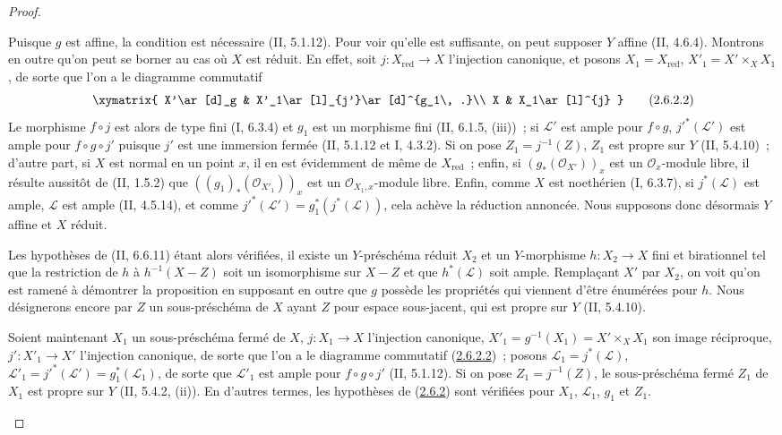 \begin{proof}
\begin{env}[2.6.2.1]
\label{III.2.6.2.1-fr}
Puisque $g$ est affine, la condition est nécessaire (II, 5.1.12). Pour
voir qu'elle est suffisante, on peut supposer $Y$ affine (II, 4.6.4).
Montrons en outre qu'on peut se borner au cas où $X$ est réduit. En
effet, soit $j:X_{\mathrm{red}}\to X$ l'injection canonique, et posons
$X_1=X_{\mathrm{red}}$, $X'_1=X'\times_X X_1$, de sorte que l'on a le
diagramme commutatif
\[
\xymatrix{
X'\ar[d]_g & X'_1\ar[l]_{j'}\ar[d]^{g_1\, .}\\
X & X_1\ar[l]^{j}
}
\tag{2.6.2.2}\label{III.2.6.2.2-fr}
\]
Le morphisme $f\circ j$ est alors de type fini (I, 6.3.4) et $g_1$ est
un morphisme fini (II, 6.1.5, (iii))~; si $\mathcal L'$ est ample pour
$f\circ g$, $j'^*(\mathcal L')$ est ample pour $f\circ g\circ j'$ puisque
$j'$ est une immersion fermée (II, 5.1.12 et I, 4.3.2). Si on pose
$Z_1=j^{-1}(Z)$, $Z_1$ est propre sur $Y$ (II, 5.4.10)~; d'autre part,
si $X$ est normal en un point $x$, il en est évidemment de même de
$X_{\mathrm{red}}$~; enfin, si $(g_*(\mathcal O_{X'}))_x$ est un
$\mathcal O_x$-module libre, il résulte aussitôt de (II, 1.5.2) que
$((g_1)_*(\mathcal O_{X'_1}))_x$ est un $\mathcal O_{X_1,x}$-module
libre. Enfin, comme $X$ est noethérien (I, 6.3.7), si
$j^*(\mathcal L)$ est ample, $\mathcal L$ est ample (II, 4.5.14), et
comme $j'^*(\mathcal L')=g_1^*(j^*(\mathcal L))$, cela achève la
réduction annoncée. Nous supposons donc désormais $Y$ affine et $X$
réduit.
\end{env}

Les hypothèses de (II, 6.6.11) étant alors vérifiées, il existe un
$Y$-préschéma réduit $X_2$ et un $Y$-morphisme $h:X_2\to X$ fini et
birationnel tel que la restriction de $h$ à $h^{-1}(X-Z)$ soit un
isomorphisme sur $X-Z$ et que $h^*(\mathcal L)$ soit ample. Remplaçant
$X'$ par $X_2$, on voit qu'on est ramené à démontrer la proposition en
supposant en outre que $g$ possède les propriétés qui viennent d'être
énumérées pour $h$. Nous désignerons encore par $Z$ un sous-préschéma de
$X$ ayant $Z$ pour espace sous-jacent, qui est propre sur $Y$
(II, 5.4.10).

\begin{env}[2.6.2.3]
\label{III.2.6.2.3-fr}
Soient maintenant $X_1$ un sous-préschéma fermé de $X$,
$j:X_1\to X$ l'injection canonique,
$X'_1=g^{-1}(X_1)=X'\times_X X_1$ son image réciproque,
$j':X'_1\to X'$ l'injection canonique, de sorte que l'on a le diagramme
commutatif (\hyperref[III.2.6.2.2-fr]{2.6.2.2})~; posons
$\mathcal L_1=j^*(\mathcal L)$,
$\mathcal L'_1=j'^*(\mathcal L')=g_1^*(\mathcal L_1)$, de sorte que
$\mathcal L'_1$ est ample pour $f\circ g\circ j'$ (II, 5.1.12). Si on
pose $Z_1=j^{-1}(Z)$, le sous-préschéma fermé $Z_1$ de $X_1$ est propre
sur $Y$ (II, 5.4.2, (ii)). En d'autres termes, les hypothèses de
(\hyperref[III.2.6.2-fr]{2.6.2}) sont vérifiées pour $X_1$,
$\mathcal L_1$, $g_1$ et $Z_1$.
\end{env}


\end{proof}

